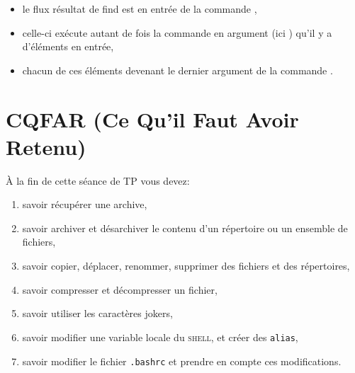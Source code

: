 \documentclass[a4paper,11pt]{article}
\newcommand{\shell}{\textsc{shell}}
\begin{document}
\begin{itemize}
  \item le flux résultat de find est en entrée de la commande ,
  \item celle-ci exécute autant de fois la commande en argument (ici 
        ) qu'il y a d'éléments en entrée,
  \item chacun de ces éléments devenant le dernier argument de la commande
        .
\end{itemize}

\section{CQFAR (Ce Qu'il Faut Avoir Retenu)}

À la fin de cette séance de TP vous devez:
\begin{enumerate}
  \item savoir récupérer une archive,
  \item savoir archiver et désarchiver le contenu d'un répertoire ou un
        ensemble de fichiers,
  \item savoir copier, déplacer, renommer, supprimer des fichiers et des
        répertoires,
  \item savoir compresser et décompresser un fichier,
  \item savoir utiliser les caractères jokers,
  \item savoir modifier une variable locale du \shell, et créer des
        \verb!alias!,
  \item savoir modifier le fichier \verb!.bashrc! et prendre
        en compte ces modifications.
\end{enumerate}
\end{document}
